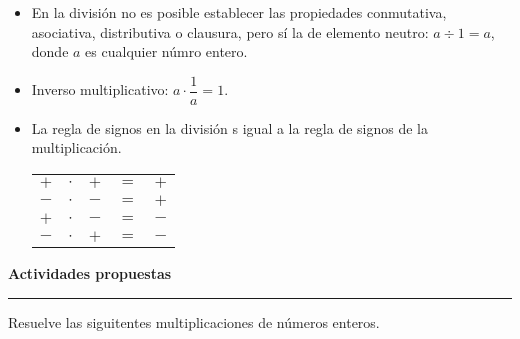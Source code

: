\documentclass[spanish,letterpaper, 11pt, addpoints, answers]{exam}
\begin{document}
\begin{questions}
\begin{itemize}
    \item En la división no es posible establecer las propiedades conmutativa, asociativa, distributiva o clausura, pero sí la de elemento neutro: $a\div 1=a$, donde $a$ es cualquier númro entero.
    \item Inverso multiplicativo: $a\cdot \dfrac{1}{a}=1$.
    \item La regla de signos en la división s igual a la regla de signos de la multiplicación.
    \begin{center}
      \begin{tabular}{ccccc}
        $+$&$\cdot$&$+$&$=$&$+$\\
        $-$&$\cdot$&$-$&$=$&$+$\\
        $+$&$\cdot$&$-$&$=$&$-$\\
        $-$&$\cdot$&$+$&$=$&$-$\\
        
      \end{tabular}
    \end{center}
    
    
  \end{itemize}
  
  \parbox{6in}{
  \textbf{Actividades propuestas}}
  \vspace{0.15in}
  \hrule 

  \question Resuelve las siguitentes multiplicaciones de números enteros.

\end{questions}
\end{document}
